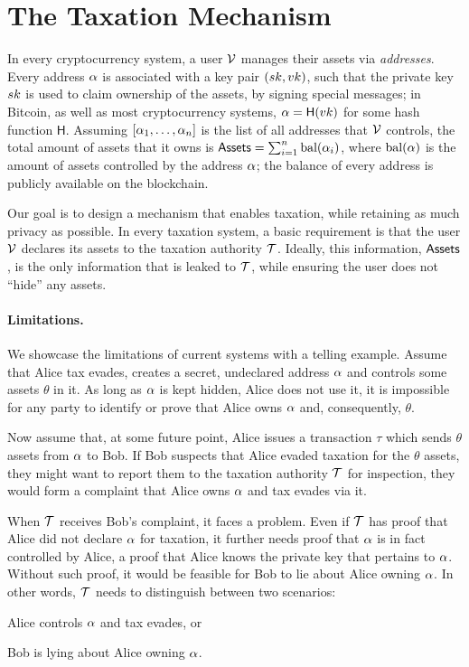 \section{The Taxation Mechanism}\label{sec:taxation}

In every cryptocurrency system, a user $\mathcal{V}$ manages their assets via
\emph{addresses}. Every address $\alpha$ is associated with a key pair
$(sk, vk)$, such that the private key $sk$ is used to claim ownership of
the assets, \eg by signing special messages; in Bitcoin, as well as most
cryptocurrency systems, $\alpha = \mathsf{H}(vk)$ for some hash
function $\mathsf{H}$. Assuming $[\alpha_1, \dots, \alpha_n]$ is the list
of all addresses that $\mathcal{V}$ controls, the total amount of assets that it owns
is $\mathsf{Assets} = \sum_{i=1}^n \text{bal}(\alpha_i)$, where $\text{bal}(\alpha)$ is
the amount of assets controlled by the address $\alpha$; the balance of every
address is publicly available on the blockchain.

Our goal is to design a mechanism that enables taxation, while retaining as
much privacy as possible. In every taxation system, a basic requirement is that
the user $\mathcal{V}$ declares its assets to the taxation authority $\mathcal{T}$.
Ideally, this information, \ie $\mathsf{Assets}$, is the only information that is
leaked to $\mathcal{T}$, while ensuring the user does not ``hide'' any assets.

\paragraph{Limitations.}\label{subsec:limitations}

We showcase the limitations of current systems with a telling example.  Assume
that Alice tax evades, \ie creates a secret, undeclared address $\alpha$ and
controls some assets $\theta$ in it. As long as $\alpha$ is kept hidden, \ie
Alice does not use it, it is impossible for any party to identify or prove that
Alice owns $\alpha$ and, consequently, $\theta$.

Now assume that, at some future point, Alice issues a transaction $\tau$ which
sends $\theta$ assets from $\alpha$ to Bob. If Bob suspects that Alice evaded
taxation for the $\theta$ assets, they might want to report them to the
taxation authority $\mathcal{T}$ for inspection, \ie they would form a complaint
that Alice owns $\alpha$ and tax evades via it.

When $\mathcal{T}$ receives Bob's complaint, it faces a problem. Even if
$\mathcal{T}$ has proof that Alice did not declare $\alpha$ for taxation, it
further needs proof that $\alpha$ is in fact controlled by Alice, \ie a proof
that Alice knows the private key that pertains to $\alpha$. Without such
proof, it would be feasible for Bob to lie about Alice owning $\alpha$. In
other words, $\mathcal{T}$ needs to distinguish between two scenarios:
\begin{inparaenum}[i)]
    \item Alice controls $\alpha$ and tax evades, or
    \item Bob is lying about Alice owning $\alpha$.
\end{inparaenum}

